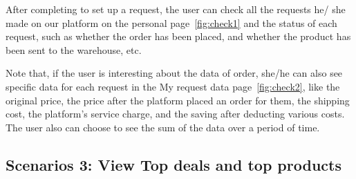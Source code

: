 After completing to set up a request, the user can check all the requests he/ she made on our platform on the personal page~\ref{fig:check1} and the status of each request, such as whether the order has been placed, and whether the product has been sent to the warehouse, etc.

Note that, if the user is interesting about the data of order, she/he can also see specific data for each request in the My request data page~\ref{fig:check2}, like the original price, the price after the platform placed an order for them, the shipping cost, the platform's service charge, and the saving after deducting various costs. The user also can choose to see the sum of the data over a period of time.

\subsection{Scenarios 3: View Top deals and top products}

